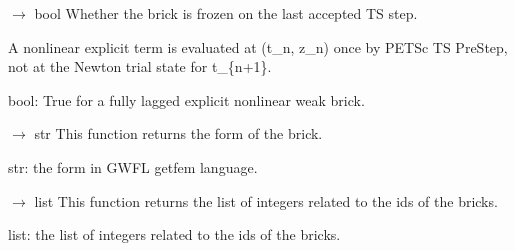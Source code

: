 \documentclass[letterpaper,10pt,english]{sphinxmanual}
\begin{document}
\begin{fulllineitems}
\begin{fulllineitems}
\begin{description}
\end{description}

\end{fulllineitems}


\begin{fulllineitems}
\label{\detokenize{scrimp:scrimp.brick.Brick.get_explicit}}
\pysigstartsignatures
\pysiglinewithargsret
{}
{}
{{ $\rightarrow$ bool}}
\pysigstopsignatures
\sphinxAtStartPar
Whether the brick is frozen on the last accepted TS step.

\sphinxAtStartPar
A nonlinear explicit term is evaluated at (t\_n, z\_n) once by
PETSc TS PreStep, not at the Newton trial state for t\_\{n+1\}.
\begin{description}
\sphinxAtStartPar
bool: True for a fully lagged explicit nonlinear weak brick.

\end{description}

\end{fulllineitems}


\begin{fulllineitems}
\label{\detokenize{scrimp:scrimp.brick.Brick.get_form}}
\pysigstartsignatures
\pysiglinewithargsret
{}
{}
{{ $\rightarrow$ str}}
\pysigstopsignatures
\sphinxAtStartPar
This function returns the form of the brick.
\begin{description}
\sphinxAtStartPar
str: the form in GWFL getfem language.

\end{description}

\end{fulllineitems}


\begin{fulllineitems}
\label{\detokenize{scrimp:scrimp.brick.Brick.get_id_bricks}}
\pysigstartsignatures
\pysiglinewithargsret
{}
{}
{{ $\rightarrow$ list}}
\pysigstopsignatures
\sphinxAtStartPar
This function returns the list of integers related to the ids of the bricks.
\begin{description}
\sphinxAtStartPar
list: the list of integers related to the ids of the bricks.


\end{description}
\end{fulllineitems}
\end{fulllineitems}
\end{document}
